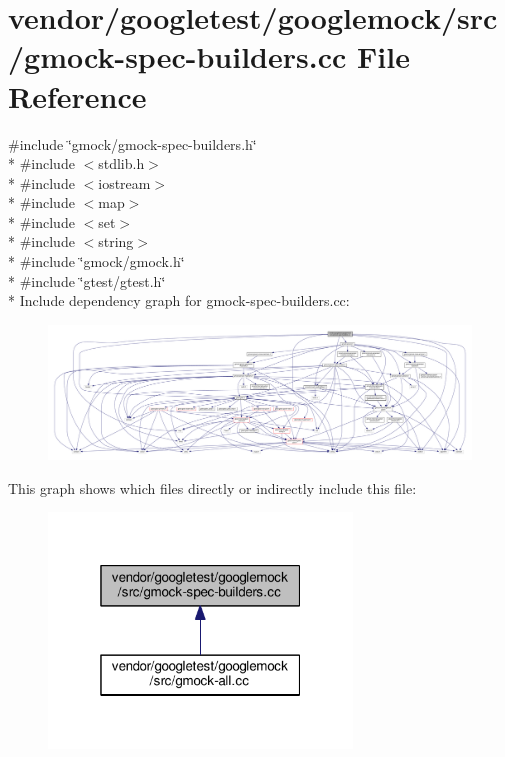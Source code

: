 \hypertarget{gmock-spec-builders_8cc}{}\section{vendor/googletest/googlemock/src/gmock-\/spec-\/builders.cc File Reference}
\label{gmock-spec-builders_8cc}
{\ttfamily \#include \char`\"{}gmock/gmock-\/spec-\/builders.\+h\char`\"{}}\\*
{\ttfamily \#include $<$stdlib.\+h$>$}\\*
{\ttfamily \#include $<$iostream$>$}\\*
{\ttfamily \#include $<$map$>$}\\*
{\ttfamily \#include $<$set$>$}\\*
{\ttfamily \#include $<$string$>$}\\*
{\ttfamily \#include \char`\"{}gmock/gmock.\+h\char`\"{}}\\*
{\ttfamily \#include \char`\"{}gtest/gtest.\+h\char`\"{}}\\*
Include dependency graph for gmock-\/spec-\/builders.cc\+:
\nopagebreak
\begin{figure}[H]
\begin{center}
\leavevmode
\includegraphics[width=350pt]{gmock-spec-builders_8cc__incl}
\end{center}
\end{figure}
This graph shows which files directly or indirectly include this file\+:
\nopagebreak
\begin{figure}[H]
\begin{center}
\leavevmode
\includegraphics[width=229pt]{gmock-spec-builders_8cc__dep__incl}
\end{center}
\end{figure}
